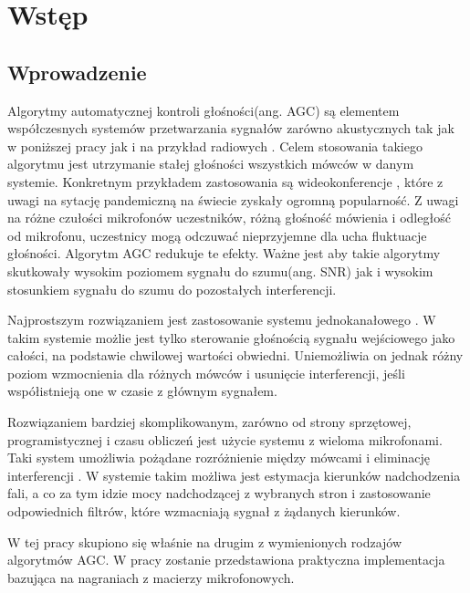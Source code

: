 \chapter{Wstęp}
\section{Wprowadzenie}

Algorytmy automatycznej kontroli głośności(ang. AGC) są elementem współczesnych systemów przetwarzania sygnałów zarówno akustycznych tak jak w poniższej pracy jak i na przykład radiowych \cite{agc_5g}. Celem stosowania takiego algorytmu jest utrzymanie stałej głośności wszystkich mówców w danym systemie. Konkretnym przykładem zastosowania są wideokonferencje \cite{agc_application}, które z uwagi na sytację pandemiczną na świecie zyskały ogromną popularność. Z uwagi na różne czułości mikrofonów uczestników, różną głośność mówienia i odległość od mikrofonu, uczestnicy mogą odczuwać nieprzyjemne dla ucha fluktuacje głośności. Algorytm AGC redukuje te efekty. Ważne jest aby takie algorytmy skutkowały wysokim poziomem sygnału do szumu(ang. SNR) jak i wysokim stosunkiem sygnału do szumu do pozostałych interferencji.

Najprostszym rozwiązaniem jest zastosowanie systemu jednokanałowego \cite{Archibald2008}. W takim systemie możlie jest tylko sterowanie głośnością sygnału wejściowego jako całości, na podstawie chwilowej wartości obwiedni. Uniemożliwia on jednak różny poziom wzmocnienia dla różnych mówców i usunięcie interferencji, jeśli współistnieją one w czasie z głównym sygnałem.

Rozwiązaniem bardziej skomplikowanym, zarówno od strony sprzętowej, programistycznej i czasu obliczeń jest użycie systemu z wieloma mikrofonami. Taki system umożliwia pożądane rozróżnienie między mówcami i eliminację interferencji \cite{Thiergart2013}. W systemie takim możliwa jest estymacja kierunków nadchodzenia fali, a co za tym idzie mocy nadchodzącej z wybranych stron i zastosowanie odpowiednich filtrów, które wzmacniają sygnał z żądanych kierunków.

W tej pracy skupiono się właśnie na drugim z wymienionych rodzajów algorytmów AGC. W pracy zostanie przedstawiona praktyczna implementacja bazująca na nagraniach z macierzy mikrofonowych.

